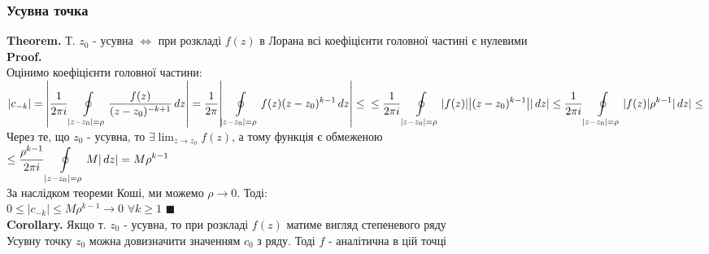 \documentclass[a4paper, 14pt]{extarticle}
\def\hugespace{\vspace{5mm} \\}
\begin{document}
	 \subsubsection{Усувна точка}
	 \textbf{Theorem.} Т. $z_0$ - усувна $\iff$ при розкладі $f(z)$ в Лорана всі коефіцієнти головної частині є нулевими\\
	 \textbf{Proof.}\\
	 Оцінимо коефіцієнти головної частини:\\
	 $\displaystyle \abs{c_{-k}} = \abs{\frac{1}{2 \pi i}\oint\displaylimits_{|z-z_0|=\rho} \frac{f(z)}{(z-z_0)^{-k+1}} \,dz} = \frac{1}{2 \pi}\abs{\oint\displaylimits_{|z-z_0|=\rho} f(z)(z-z_0)^{k-1} \,dz} \leq \\ \leq \frac{1}{2 \pi i}\oint\displaylimits_{|z-z_0|=\rho} \abs{f(z)} \abs{(z-z_0)^{k-1}} \abs{\,dz} \leq \frac{1}{2 \pi i}\oint\displaylimits_{|z-z_0|=\rho} \abs{f(z)} \rho^{k-1} \abs{\,dz} \leq$\\
	 Через те, що $z_0$ - усувна, то $\displaystyle\exists \lim_{z \to z_0} f(z)$, а тому функція є обмеженою\\
	 $\leq \displaystyle \frac{\rho^{k-1}}{2 \pi i}\oint\displaylimits_{|z-z_0|=\rho} M  \abs{\,dz} = M \rho^{k-1}$\\
	 За наслідком теореми Коші, ми можемо $\rho \to 0$. Тоді:\\
	 $0\leq|c_{-k}|\leq M \rho^{k-1} \to 0$ $\forall k \geq 1$ $\blacksquare$
	 \hugespace
	 \textbf{Corollary.} Якщо т. $z_0$ - усувна, то при розкладі $f(z)$ матиме вигляд степеневого ряду
	 \hugespace
	 Усувну точку $z_0$ можна довизначити значенням $c_0$ з ряду. Тоді $f$ - аналітична в цій точці
	 \hugespace
	 
\end{document}
